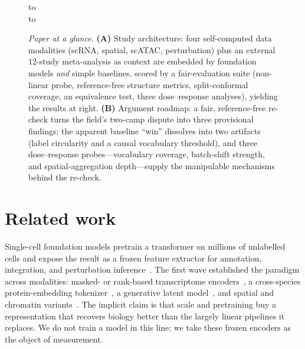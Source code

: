 \documentclass[fleqn,10pt,lineno]{wlpeerj}  %
\begin{document}
\begin{figure}[!htbp]\centering
\hbox to \linewidth{\hfil\normalfont\small\itshape Study architecture\hfil}\vspace{2pt}
\resizebox{\linewidth}{!}{}\\[6pt]
\hbox to \linewidth{\hfil\normalfont\small\itshape Argument roadmap\hfil}\vspace{2pt}
\resizebox{\linewidth}{!}{}
\caption{\emph{Paper at a glance.} \textbf{(A)} Study architecture: four self-computed data modalities (scRNA, spatial, scATAC, perturbation) plus an external 12-study meta-analysis as context are embedded by foundation models \emph{and} simple baselines, scored by a fair-evaluation suite (non-linear probe, reference-free structure metrics, split-conformal coverage, an equivalence test, three dose--response analyses), yielding the results at right. \textbf{(B)} Argument roadmap: a fair, reference-free re-check turns the field's two-camp dispute into three provisional findings; the apparent baseline ``win'' dissolves into two artifacts (label circularity and a causal vocabulary threshold), and three dose--response probes---vocabulary coverage, batch-shift strength, and spatial-aggregation depth---supply the manipulable mechanisms behind the re-check.}\label{fig:schematic}\end{figure}

\section{Related work}

Single-cell foundation models pretrain a transformer on millions of unlabelled cells and expose the result as a frozen feature extractor for annotation, integration, and perturbation inference~\cite{bommasani2021,vaswani2017}. The first wave established the paradigm across modalities: masked- or rank-based transcriptome encoders~\cite{scgpt2024,geneformer2023,scfoundation2024}, a cross-species protein-embedding tokenizer~\cite{uce2023}, a generative latent model~\cite{cellplm2024}, and spatial and chromatin variants~\cite{nicheformer2025,chromfound2025,atacformer2024,epifoundation2025}. The implicit claim is that scale and pretraining buy a representation that recovers biology better than the largely linear pipelines it replaces. We do not train a model in this line; we take these frozen encoders as the object of measurement.
\end{document}
